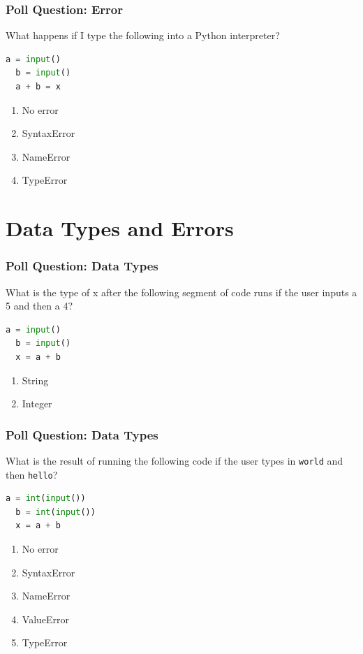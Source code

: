 \documentclass{beamer}
\begin{document}
%
%
%
\begin{frame}[fragile]
  \frametitle{Poll Question: Error}
  What happens if I type the following into a Python interpreter?
  \begin{lstlisting}[language=Python]
  a = input()
  b = input()
  a + b = x \end{lstlisting}
  \begin{enumerate}
    \item No error
    \item SyntaxError
    \item NameError
    \item TypeError
  \end{enumerate}
\end{frame}

\section{Data Types and Errors}

%
%
%
\begin{frame}[fragile]
  \frametitle{Poll Question: Data Types}
  What is the type of x after the following segment of code runs if the user inputs a 5 and then a 4?
  \begin{lstlisting}[language=Python]
  a = input()
  b = input()
  x = a + b\end{lstlisting}
  \begin{enumerate}[A]
    \item String
    \item Integer
  \end{enumerate}
\end{frame}

%
%
%
\begin{frame}[fragile]
  \frametitle{Poll Question: Data Types}
  What is the result of running the following code if the user types in \lstinline|world| and then \lstinline|hello|?
  \begin{lstlisting}[language=Python]
  a = int(input())
  b = int(input())
  x = a + b\end{lstlisting}
  \begin{enumerate}[A]
    \item No error
    \item SyntaxError
    \item NameError
    \item ValueError
    \item TypeError
  \end{enumerate}
\end{frame}
\end{document}

